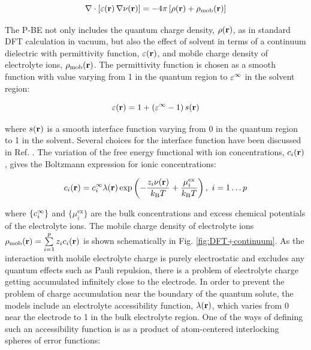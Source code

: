 \documentclass[../main.tex]{subfiles}
\begin{document}
\begin{equation}
    \label{eq:pbe}
    \nabla\cdot\left[\varepsilon\!\left(\mathbf{r}\right)\nabla\nu\!\left(\mathbf{r}\right)\right]=-4\pi\left[\rho\!\left(\mathbf{r}\right)+\rho_{\textrm{mob}}\!\left(\mathbf{r}\right)\right]
\end{equation}

The P-BE not only includes the quantum charge density, $\rho\!\left(\mathbf{r}\right)$, as in standard DFT calculation in vacuum, but also the effect of solvent in terms of a continuum dielectric with permittivity function, $\varepsilon\!\left(\mathbf{r}\right)$, and mobile charge density of electrolyte ions, $\rho_{\textrm{mob}}\!\left(\mathbf{r}\right)$. The permittivity function is chosen as a smooth function with value varying from 1 in the quantum region to $\varepsilon^\infty$ in the solvent region:\cite{Nattino2019}

\begin{equation}
    \varepsilon\!\left(\mathbf{r}\right)=1+\left(\varepsilon^\infty-1\right)s\!\left(\mathbf{r}\right)
\end{equation}

where $s\!\left(\mathbf{r}\right)$ is a smooth interface function varying from 0 in the quantum region to 1 in the solvent. Several choices for the interface function have been discussed in Ref. . The variation of the free energy functional with ion concentrations, $c_i\!\left(\mathbf{r}\right)$, gives the Boltzmann expression for ionic concentrations:

\begin{equation}
    \label{eq:cig}
    \ci\ofrvec = \cif\lambda(\mathbf{r}) \exp \left(-\frac{z_i\nu(\mathbf{r})}{k_{\textrm{B}} T} +\frac{\mu_i^\textrm{ex}}{k_{\textrm{B}} T} \right), \ i=1\dots{}p
\end{equation}

where $\{c_i^{\infty}\}$ and $\{\mu_i^\textrm{ex}\}$ are the bulk concentrations and excess chemical potentials of the electrolyte ions. The mobile charge density of electrolyte ions $\rho_{\textrm{mob}}\!\left(\mathbf{r}\right)=\sum\limits_{i=1}^p z_ic_i\!\left(\mathbf{r}\right)$ is shown schematically in Fig. \ref{fig:DFT+continuum}. As the interaction with mobile electrolyte charge is purely electrostatic and excludes any quantum effects such as Pauli repulsion, there is a problem of electrolyte charge getting accumulated infinitely close to the electrode. In order to prevent the problem of charge accumulation near the boundary of the quantum solute, the models include an electrolyte accessibility function, $\lambda\!\left(\mathbf{r}\right)$, which varies from 0 near the electrode to 1 in the bulk electrolyte region.\cite{Fisicaro2017, Sundararaman2018, Stein2019} One of the ways of defining such an accessibility function is as a product of atom-centered interlocking spheres of error functions:\cite{Dziedzic2020}
\end{document}
